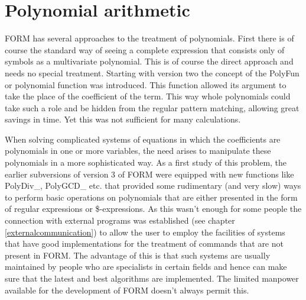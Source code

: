 
\chapter{Polynomial arithmetic}
\label{polynomials}

FORM has several approaches to the treatment of polynomials. First there is 
of course the standard way of seeing a complete expression that consists 
only of symbols as a multivariate polynomial. This is of course the direct 
approach and needs no special treatment. Starting with version two the 
concept of the PolyFun or polynomial function was introduced. This function 
allowed its argument to take the place of the coefficient of the term. This 
way whole polynomials could take such a role and be hidden from the regular 
pattern matching, allowing great savings in time. Yet this was not 
sufficient for many calculations.

When solving complicated systems of equations in which the coefficients are 
polynomials in one or more variables, the need arises to manipulate these 
polynomials in a more sophisticated way. As a first study of this problem, 
the earlier subversions of version 3 of FORM were equipped with new 
functions like PolyDiv\_, PolyGCD\_ etc. that provided some rudimentary 
(and very slow) ways to perform basic operations on polynomials that are 
either presented in the form of regular expressions or \$-expressions. As 
this wasn't enough for some people the connection with external programs 
was established (see chapter \ref{externalcommunication}) to allow the user 
to employ the facilities of systems that have good implementations for the 
treatment of commands that are not present in FORM. The advantage of this 
is that such systems are usually maintained by people who are specialists 
in certain fields and hence can make sure that the latest and best 
algorithms are implemented. The limited manpower available for the 
development of FORM doesn't always permit this.

